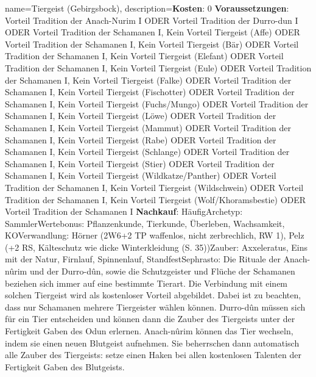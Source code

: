{
    name={Tiergeist (Gebirgsbock)},
    description={\textbf{Kosten}: 0 \textbf{Voraussetzungen}: Vorteil Tradition der Anach-Nurim I ODER Vorteil Tradition der Durro-dun I ODER Vorteil Tradition der Schamanen I, Kein Vorteil Tiergeist (Affe) ODER Vorteil Tradition der Schamanen I, Kein Vorteil Tiergeist (Bär) ODER Vorteil Tradition der Schamanen I, Kein Vorteil Tiergeist (Elefant) ODER Vorteil Tradition der Schamanen I, Kein Vorteil Tiergeist (Eule) ODER Vorteil Tradition der Schamanen I, Kein Vorteil Tiergeist (Falke) ODER Vorteil Tradition der Schamanen I, Kein Vorteil Tiergeist (Fischotter) ODER Vorteil Tradition der Schamanen I, Kein Vorteil Tiergeist (Fuchs/Mungo) ODER Vorteil Tradition der Schamanen I, Kein Vorteil Tiergeist (Löwe) ODER Vorteil Tradition der Schamanen I, Kein Vorteil Tiergeist (Mammut) ODER Vorteil Tradition der Schamanen I, Kein Vorteil Tiergeist (Rabe) ODER Vorteil Tradition der Schamanen I, Kein Vorteil Tiergeist (Schlange) ODER Vorteil Tradition der Schamanen I, Kein Vorteil Tiergeist (Stier) ODER Vorteil Tradition der Schamanen I, Kein Vorteil Tiergeist (Wildkatze/Panther) ODER Vorteil Tradition der Schamanen I, Kein Vorteil Tiergeist (Wildschwein) ODER Vorteil Tradition der Schamanen I, Kein Vorteil Tiergeist (Wolf/Khoramsbestie) ODER Vorteil Tradition der Schamanen I \textbf{Nachkauf}: Häufig\newline Archetyp: Sammler\newline Wertebonus: Pflanzenkunde, Tierkunde, Überleben, Wachsamkeit, KO\newline Verwandlung: Hörner (2W6+2 TP waffenlos, nicht zerbrechlich, RW 1), Pelz (+2 RS, Kälteschutz wie dicke Winterkleidung (S. 35))\newline Zauber: Axxeleratus, Eins mit der Natur, Firnlauf, Spinnenlauf, Standfest\newline Sephrasto: Die Rituale der Anach-nûrim und der Durro-dûn, sowie die Schutzgeister und Flüche der Schamanen beziehen sich immer auf eine bestimmte Tierart. Die Verbindung mit einem solchen Tiergeist wird als kostenloser Vorteil abgebildet. Dabei ist zu beachten, dass nur Schamanen mehrere Tiergeister wählen können. Durro-dûn müssen sich für ein Tier entscheiden und können dann die Zauber des Tiergeists unter der Fertigkeit Gaben des Odun erlernen. Anach-nûrim können das Tier wechseln, indem sie einen neuen Blutgeist aufnehmen. Sie beherrschen dann automatisch alle Zauber des Tiergeists: setze einen Haken bei allen kostenlosen Talenten der Fertigkeit Gaben des Blutgeists.}
}



